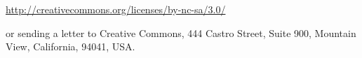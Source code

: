 \begin{center}
\href{http://creativecommons.org/licenses/by-nc-sa/3.0/}
{http://creativecommons.org/licenses/by-nc-sa/3.0/}
\end{center}
or sending a letter to Creative Commons, 444 Castro Street, Suite 900, Mountain View, California,
94041, USA.


\endinput
